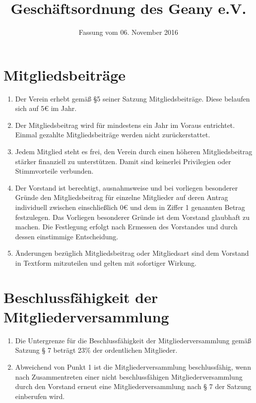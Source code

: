 \documentclass[fontsize=12pt,paper=a4,pagesize,headings=small]{scrartcl}
\title{Geschäftsordnung des Geany e.V.}
\date{Fassung vom 06. November 2016}
\begin{document}
\maketitle{}

\section{Mitgliedsbeiträge}
\begin{enumerate}
    \item Der Verein erhebt gemäß §5 seiner Satzung Mitgliedsbeiträge.
        Diese belaufen sich auf 5\euro{} im Jahr.

    \item Der Mitgliedsbeitrag wird für mindestens ein Jahr im Voraus
        entrichtet. Einmal gezahlte Mitgliedsbeiträge werden nicht
        zurückerstattet.

    \item Jedem Mitglied steht es frei, den Verein durch einen höheren
        Mitgliedsbeitrag stärker finanziell zu unterstützen. Damit sind
        keinerlei Privilegien oder Stimmvorteile verbunden.

    \item Der Vorstand ist berechtigt, ausnahmsweise und bei vorliegen
        besonderer Gründe den Mitgliedsbeitrag für einzelne Mitglieder
        auf deren Antrag individuell zwischen einschließlich 0\euro{}
        und dem in Ziffer 1 genannten Betrag festzulegen. Das Vorliegen
        besonderer Gründe ist dem Vorstand glaubhaft zu machen. Die
        Festlegung erfolgt nach Ermessen des Vorstandes und durch dessen
        einstimmige Entscheidung.

    \item Änderungen bezüglich Mitgliedsbeitrag oder Mitgliedsart sind dem
        Vorstand in Textform mitzuteilen und gelten mit sofortiger Wirkung.
\end{enumerate}


\section{Beschlussfähigkeit der Mitgliederversammlung}
\begin{enumerate}
    \item Die Untergrenze für die Beschlussfähigkeit der
        Mitgliederversammlung gemäß Satzung § 7 beträgt 23\% der
        ordentlichen Mitglieder.

    \item Abweichend von Punkt 1 ist die Mitgliederversammlung
        beschlussfähig, wenn nach Zusammentreten einer nicht
        beschlussfähigen Mitgliederversammlung durch den
        Vorstand erneut eine Mitgliederversammlung nach § 7 der Satzung
        einberufen wird.
\end{enumerate}
\end{document}
